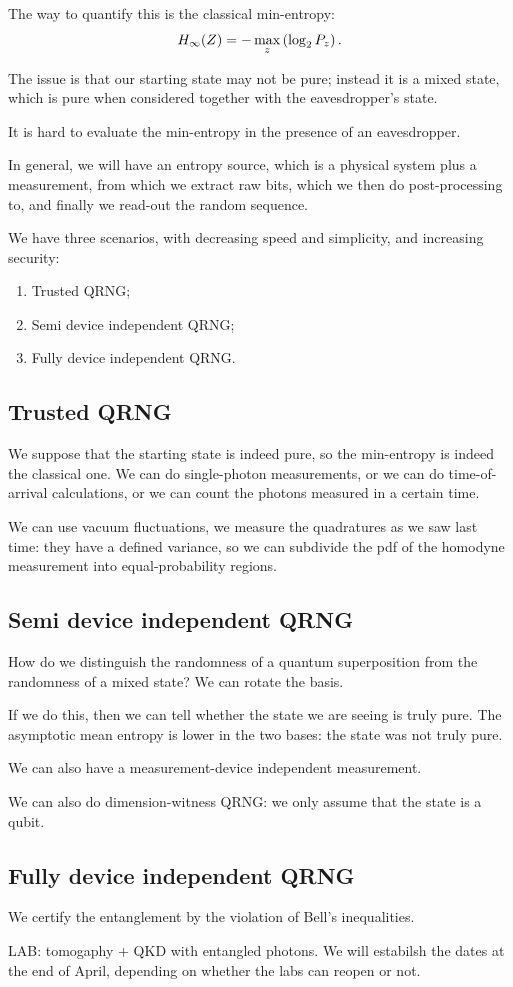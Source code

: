 \documentclass[main.tex]{subfiles}
\begin{document}
The way to quantify this is the classical min-entropy: 
%
\begin{align}
H_{ \infty } (Z) = - \max_{z} \qty(\log_2 P_z )
\,.
\end{align}

The issue is that our starting state may not be pure; instead it is a mixed state, which is pure when considered together with the eavesdropper's state. 

It is hard to evaluate the min-entropy in the presence of an eavesdropper. 

In general, we will have an entropy source, which is a physical system plus a measurement, from which we extract raw bits, which we then do post-processing to, and finally we read-out the random sequence. 

We have three scenarios, with decreasing speed and simplicity, and increasing security: 
\begin{enumerate}
    \item Trusted QRNG;
    \item Semi device independent QRNG;
    \item Fully device independent QRNG. 
\end{enumerate}

\subsection{Trusted QRNG}

We suppose that the starting state is indeed pure, so the min-entropy is indeed the classical one. 
We can do single-photon measurements, or we can do time-of-arrival calculations, or we can count the photons measured in a certain time. 

We can use vacuum fluctuations, we measure the quadratures as we saw last time: they have a defined variance, so we can subdivide the pdf of the homodyne measurement into equal-probability regions.

\subsection{Semi device independent QRNG}

How do we distinguish the randomness of a quantum superposition from the randomness of a mixed state? We can rotate the basis.

If we do this, then we can tell whether the state we are seeing is truly pure. 
The asymptotic mean entropy is lower in the two bases: the state was not truly pure. 

We can also have a measurement-device independent measurement. 

We can also do dimension-witness QRNG: we only assume that the state is a qubit. 

\subsection{Fully device independent QRNG}

We certify the entanglement by the violation of Bell's inequalities. 

LAB: tomogaphy + QKD with entangled photons. 
We will estabilsh the dates at the end of April, depending on whether the labs can reopen or not. 
\end{document}

